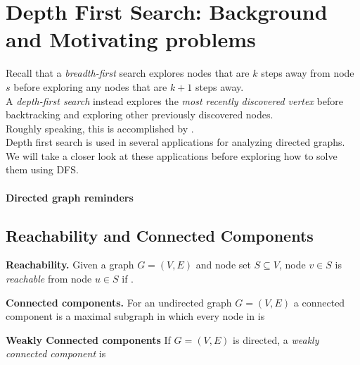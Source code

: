 \documentclass[11  pt]{exam}
\begin{document}
	\section{Depth First Search: Background and Motivating problems}
	Recall that a \emph{breadth-first} search explores nodes that are $k$ steps away from node $s$ before exploring any nodes that are $k+1$ steps away. \\
	
	A \emph{depth-first search} instead explores the \emph{most recently discovered vertex} before backtracking and exploring other previously discovered nodes.\\
	
	Roughly speaking, this is accomplished by . \\
	
	Depth first search is used in several applications for analyzing directed graphs. We will take a closer look at these applications before exploring how to solve them using DFS. \\
	
	\paragraph{Directed graph reminders}
	
	
	\newpage
	
	\subsection{Reachability and Connected Components}
	\textbf{Reachability.} Given a graph $G = (V,E)$ and node set $S \subseteq V$, node $v \in S$ is \emph{reachable} from node $u \in S$ if . \\
	\vfill
	
	
	\textbf{Connected components.} 
	For an undirected graph $G = (V,E)$ a connected component is a maximal subgraph in which every node in is  \\
	
	
	\vfill
	
	\textbf{Weakly Connected components} If $G = (V,E)$ is directed, a \emph{weakly connected component} is \\ %
	
	
	\vfill
	
\end{document}
